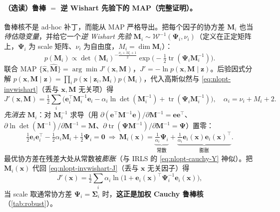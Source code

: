 \paragraph{（选读）鲁棒 $=$ 逆 Wishart 先验下的 MAP（完整证明）。}\cite{barfoot2024state}
鲁棒核不是 ad-hoc 补丁，而能从 MAP 严格导出。把每个因子的协方差 $\mathbf{M}_i$ 也当\emph{待估隐变量}，并给它一个\emph{逆 Wishart 先验} $\mathbf{M}_i\sim\mathcal{W}^{-1}(\boldsymbol{\Psi}_i,\nu_i)$（定义在正定矩阵上，$\boldsymbol{\Psi}_i$ 为 scale 矩阵、$\nu_i$ 为自由度，$M_i=\dim\mathbf{M}_i$）：
\begin{equation}
  p(\mathbf{M}_i)\propto\det(\mathbf{M}_i)^{-\frac{\nu_i+M_i+1}{2}}\exp\!\Big(-\tfrac12\operatorname{tr}(\boldsymbol{\Psi}_i\mathbf{M}_i^{-1})\Big).
  \label{eq:nlopt-invwishart}
\end{equation}
联合 MAP $\{\hat{\mathbf{x}},\hat{\mathbf{M}}\}=\arg\min J'(\mathbf{x},\mathbf{M})$，$J'=-\ln p(\mathbf{x},\mathbf{M}\mid\mathbf{z})$。后验因式分解 $p(\mathbf{x},\mathbf{M}\mid\mathbf{z})=\prod_i p(\mathbf{x}\mid\mathbf{z}_i,\mathbf{M}_i)p(\mathbf{M}_i)$，代入高斯似然与 \cref{eq:nlopt-invwishart}（丢与 $\mathbf{x},\mathbf{M}$ 无关项）得
\begin{equation}
  J'(\mathbf{x},\mathbf{M})=\tfrac12\sum_i\Big(\mathbf{e}_i^\top\mathbf{M}_i^{-1}\mathbf{e}_i-\alpha_i\ln\det(\mathbf{M}_i^{-1})+\operatorname{tr}(\boldsymbol{\Psi}_i\mathbf{M}_i^{-1})\Big),\quad \alpha_i=\nu_i+M_i+2.
  \label{eq:nlopt-invwishart-J}
\end{equation}
\emph{先消去 $\mathbf{M}_i$}：对 $\mathbf{M}_i^{-1}$ 求导（用 $\partial(\mathbf{e}^\top\mathbf{M}^{-1}\mathbf{e})/\partial\mathbf{M}^{-1}=\mathbf{e}\mathbf{e}^\top$、$\partial\ln\det(\mathbf{M}^{-1})/\partial\mathbf{M}^{-1}=\mathbf{M}$、$\partial\operatorname{tr}(\boldsymbol{\Psi}\mathbf{M}^{-1})/\partial\mathbf{M}^{-1}=\boldsymbol{\Psi}$）置零：
\begin{equation}
  \tfrac12\mathbf{e}_i\mathbf{e}_i^\top-\tfrac12\alpha_i\mathbf{M}_i+\tfrac12\boldsymbol{\Psi}_i=\mathbf{0}
  \ \Rightarrow\ \mathbf{M}_i(\mathbf{x})=\underbrace{\tfrac1{\alpha_i}\boldsymbol{\Psi}_i}_{\text{常数}}+\underbrace{\tfrac1{\alpha_i}\mathbf{e}_i(\mathbf{x})\mathbf{e}_i(\mathbf{x})^\top}_{\text{膨胀}}.
  \label{eq:nlopt-invwishart-M}
\end{equation}
最优协方差在残差大处从常数被\emph{膨胀}（与 IRLS 的 \cref{eq:nlopt-cauchy-Y} 神似）。把 $\mathbf{M}_i(\mathbf{x})$ 代回 \cref{eq:nlopt-invwishart-J}（丢与 $\mathbf{x}$ 无关因子）得
\begin{equation}
  J'(\mathbf{x})=\tfrac12\sum_i\alpha_i\ln\!\big(1+\mathbf{e}_i(\mathbf{x})^\top\boldsymbol{\Psi}_i^{-1}\mathbf{e}_i(\mathbf{x})\big),
  \label{eq:nlopt-robust-cauchy}
\end{equation}
当 scale 取通常协方差 $\boldsymbol{\Psi}_i=\boldsymbol{\Sigma}_i$ 时，\textbf{这正是加权 Cauchy 鲁棒核}（\cref{tab:robust}）。

